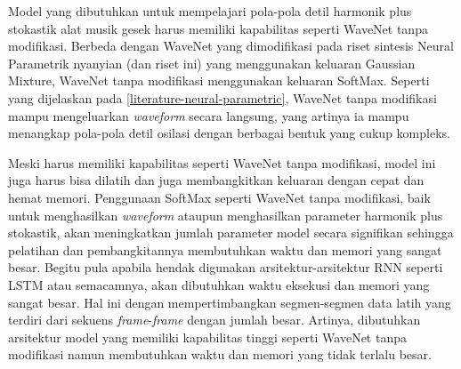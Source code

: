 Model yang dibutuhkan untuk mempelajari pola-pola detil harmonik plus stokastik alat musik gesek harus memiliki kapabilitas seperti WaveNet tanpa modifikasi. Berbeda dengan WaveNet yang dimodifikasi pada riset sintesis Neural Parametrik nyanyian (dan riset ini) yang menggunakan keluaran Gaussian Mixture, WaveNet tanpa modifikasi menggunakan keluaran SoftMax. Seperti yang dijelaskan pada \ref{literature-neural-parametric}, WaveNet tanpa modifikasi mampu mengeluarkan \textit{waveform} secara langsung, yang artinya ia mampu menangkap pola-pola detil osilasi dengan berbagai bentuk yang cukup kompleks.

Meski harus memiliki kapabilitas seperti WaveNet tanpa modifikasi, model ini juga harus bisa dilatih dan juga membangkitkan keluaran dengan cepat dan hemat memori. Penggunaan SoftMax seperti WaveNet tanpa modifikasi, baik untuk menghasilkan \textit{waveform} ataupun menghasilkan parameter harmonik plus stokastik, akan meningkatkan jumlah parameter model secara signifikan sehingga pelatihan dan pembangkitannya membutuhkan waktu dan memori yang sangat besar. Begitu pula apabila hendak digunakan arsitektur-arsitektur RNN seperti LSTM atau semacamnya, akan dibutuhkan waktu eksekusi dan memori yang sangat besar. Hal ini dengan mempertimbangkan segmen-segmen data latih yang terdiri dari sekuens \textit{frame}-\textit{frame} dengan jumlah besar. Artinya, dibutuhkan arsitektur model yang memiliki kapabilitas tinggi seperti WaveNet tanpa modifikasi namun membutuhkan waktu dan memori yang tidak terlalu besar.
